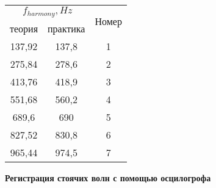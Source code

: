 \documentclass[a4paper, 12pt]{article}%
\begin{document}
\begin{enumerate}
\begin{center}
\begin{tabular}{|c|c|c|}
\hline
\multicolumn{2}{|c|}{$f_{harmony},  Hz$} & \multirow{2}{*}{Номер} \\ \cline{1-2}
теория            & практика           &                        \\ \hline
137,92            & 137,8              & 1                      \\ \hline
275,84            & 278,6              & 2                      \\ \hline
413,76            & 418,9              & 3                      \\ \hline
551,68            & 560,2              & 4                      \\ \hline
689,6             & 690                & 5                      \\ \hline
827,52            & 830,8              & 6                      \\ \hline
965,44            & 974,5              & 7                      \\ \hline
\end{tabular}
\end{center}
\end{enumerate}
\textbf{Регистрация стоячих волн с помощью осцилогрофа}
\end{document}
